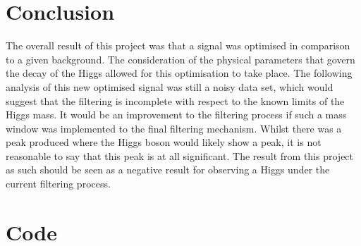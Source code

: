 \documentclass{article}
\begin{document}
\section{Conclusion}
The overall result of this project was that a signal was optimised in comparison to a given background. The consideration of the physical parameters that govern the decay of the Higgs allowed for this optimisation to take place. The following analysis of this new optimised signal was still a noisy data set, which would suggest that the filtering is incomplete with respect to the known limits of the Higgs mass. It would be an improvement to the filtering process if such a mass window was implemented to the final filtering mechanism. Whilst there was a peak produced where the Higgs boson would likely show a peak, it is not reasonable to say that this peak is at all significant. The result from this project as such should be seen as a negative result for observing a Higgs under the current filtering process. 


\appendix
\section{Code}
\end{document}
